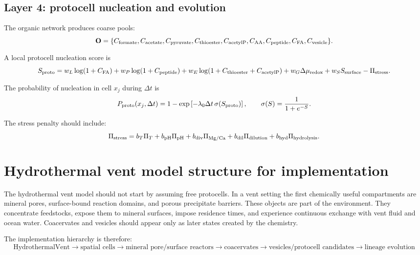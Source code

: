\documentclass[11pt]{article}
\begin{document}
\subsection{Layer 4: protocell nucleation and evolution}

The organic network produces coarse pools:
\begin{equation}
\mathbf{O}
=
\{
C_{\rm formate},
C_{\rm acetate},
C_{\rm pyruvate},
C_{\rm thioester},
C_{\rm acetylP},
C_{\rm AA},
C_{\rm peptide},
C_{\rm FA},
C_{\rm vesicle}
\}.
\end{equation}

A local protocell nucleation score is
\begin{equation}
S_{\rm proto}
=
w_L \log(1+C_{\rm FA})
+
w_P \log(1+C_{\rm peptide})
+
w_E \log(1+C_{\rm thioester}+C_{\rm acetylP})
+
w_G \Delta \mu_{\rm redox}
+
w_S S_{\rm surface}
-
\Pi_{\rm stress}.
\end{equation}

The probability of nucleation in cell $x_j$ during $\Delta t$ is
\begin{equation}
P_{\rm proto}(x_j,\Delta t)
=
1-\exp\left[-\lambda_0 \Delta t\,\sigma(S_{\rm proto})\right],
\qquad
\sigma(S)=\frac{1}{1+e^{-S}}.
\end{equation}

The stress penalty should include:
\begin{equation}
\Pi_{\rm stress}
=
b_T \Pi_T
+
b_{\rm pH}\Pi_{\rm pH}
+
b_{\rm div}\Pi_{\rm Mg/Ca}
+
b_{\rm dil}\Pi_{\rm dilution}
+
b_{\rm hyd}\Pi_{\rm hydrolysis}.
\end{equation}

\section{Hydrothermal vent model structure for implementation}

The hydrothermal vent model should not start by assuming free protocells.
In a vent setting the first chemically useful compartments are mineral pores,
surface-bound reaction domains, and porous precipitate barriers. These objects
are part of the environment. They concentrate feedstocks, expose them to mineral
surfaces, impose residence times, and experience continuous exchange with vent
fluid and ocean water. Coacervates and vesicles should appear only as later
states created by the chemistry.

The implementation hierarchy is therefore:
\begin{equation}
\boxed{
\text{HydrothermalVent}
\rightarrow
\text{spatial cells}
\rightarrow
\text{mineral pore/surface reactors}
\rightarrow
\text{coacervates}
\rightarrow
\text{vesicles/protocell candidates}
\rightarrow
\text{lineage evolution}
}
\end{equation}
\end{document}
